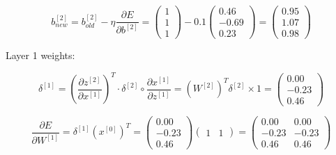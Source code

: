 \documentclass{article}
\begin{document}
\begin{enumerate}[leftmargin=\labelsep]
\begin{equation*}
  b^{[2]}_{new} =
  b^{[2]}_{old} - \eta \frac{\partial E}{\partial b^{[2]}} =
  \begin{pmatrix}
    1 \\
    1 \\
    1
    \end{pmatrix} - 0.1
    \begin{pmatrix}
      0.46 \\
      -0.69 \\
      0.23
      \end{pmatrix} =
    \begin{pmatrix}
      0.95 \\
      1.07 \\
      0.98
      \end{pmatrix}
\end{equation*}

Layer 1 weights:

\begin{equation*}
  \delta^{[1]}=\left( \frac{\partial z^{[2]}}{\partial x^{[1]}}\right)^T \cdot \delta^{[2]} \circ \frac{\partial x^{[1]}}{\partial z^{[1]}}=
  (W^{[2]})^T\delta^{[2]} \times 1 =
  \begin{pmatrix}
    0.00  \\
    -0.23 \\
    0.46
    \end{pmatrix}
\end{equation*}

\begin{equation*}
  \frac{\partial E}{\partial W^{[1]}} = \delta^{[1]} (x^{[0]})^T =
  \begin{pmatrix}
    0.00  \\
    -0.23 \\
    0.46
    \end{pmatrix}
  \begin{pmatrix}
    1 & 1
  \end{pmatrix} =
  \begin{pmatrix}
    0.00  & 0.00 \\
    -0.23 & -0.23 \\
    0.46  & 0.46
  \end{pmatrix}
\end{equation*}


\end{enumerate}
\end{document}
